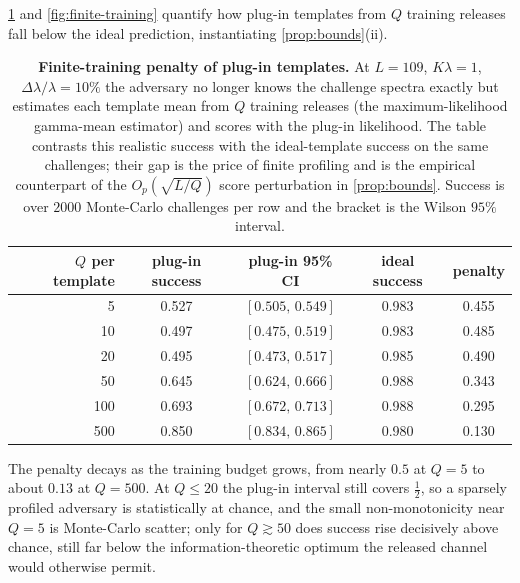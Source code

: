\documentclass[11pt]{article}
\begin{document}
\cref{tab:finite-training} and \cref{fig:finite-training} quantify how plug-in templates from \(Q\) training releases fall below the ideal prediction, instantiating \cref{prop:bounds}(ii).

\begin{table}[htbp]
\centering
\small
\renewcommand{\arraystretch}{1.15}
\caption{\textbf{Finite-training penalty of plug-in templates.} At $L=109$, $K\lambda=1$, $\Delta\lambda/\lambda=10\%$ the adversary no longer knows the challenge spectra exactly but estimates each template mean from $Q$ training releases (the maximum-likelihood gamma-mean estimator) and scores with the plug-in likelihood. The table contrasts this realistic success with the ideal-template success on the same challenges; their gap is the price of finite profiling and is the empirical counterpart of the $O_p(\sqrt{L/Q})$ score perturbation in \cref{prop:bounds}. Success is over $2000$ Monte-Carlo challenges per row and the bracket is the Wilson $95\%$ interval.}
\label{tab:finite-training}
\setlength{\tabcolsep}{8pt}
\begin{tabular}{r c c c c}
\toprule
{$Q$ per template} & {plug-in success} & {plug-in 95\% CI} & {ideal success} & {penalty} \\
\midrule
5 & 0.527 & $[0.505,\,0.549]$ & 0.983 & 0.455 \\
10 & 0.497 & $[0.475,\,0.519]$ & 0.983 & 0.485 \\
20 & 0.495 & $[0.473,\,0.517]$ & 0.985 & 0.490 \\
50 & 0.645 & $[0.624,\,0.666]$ & 0.988 & 0.343 \\
100 & 0.693 & $[0.672,\,0.713]$ & 0.988 & 0.295 \\
500 & 0.850 & $[0.834,\,0.865]$ & 0.980 & 0.130 \\
\bottomrule
\end{tabular}
\par\vspace{3pt}
\begin{minipage}{0.92\linewidth}\footnotesize The penalty decays as the training budget grows, from nearly $0.5$ at $Q=5$ to about $0.13$ at $Q=500$. At $Q\le20$ the plug-in interval still covers $\tfrac12$, so a sparsely profiled adversary is statistically at chance, and the small non-monotonicity near $Q=5$ is Monte-Carlo scatter; only for $Q\gtrsim50$ does success rise decisively above chance, still far below the information-theoretic optimum the released channel would otherwise permit.\end{minipage}
\end{table}
\end{document}
